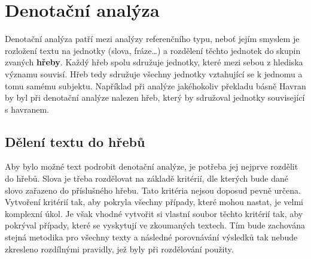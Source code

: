 \documentclass[dp.tex]{subfiles}
\begin{document}
\chapter{Denotační analýza}

Denotační analýza patří mezi analýzy referenčního typu, neboť jejím smyslem je rozložení textu na jednotky (slova, fráze\ldots) a rozdělení těchto jednotek do skupin zvaných \textbf{hřeby}. Každý hřeb spolu sdružuje jednotky, které mezi sebou z hlediska významu souvisí. Hřeb tedy sdružuje všechny jednotky vztahující se k jednomu a tomu samému subjektu. Například při analýze jakéhokoliv překladu básně Havran by byl při denotační analýze nalezen hřeb, který by sdružoval jednotky související s havranem.

\section{Dělení textu do hřebů}

Aby bylo možné text podrobit denotační analýze, je potřeba jej nejprve rozdělit do hřebů. Slova je třeba rozdělovat na základě kritérií, dle kterých bude dané slovo zařazeno do příslušného hřebu. Tato kritéria nejsou doposud pevně určena. Vytvoření kritérií tak, aby pokryla všechny případy, které mohou nastat, je velmi komplexní úkol. Je však vhodné vytvořit si vlastní soubor těchto kritérií tak, aby pokrýval případy, které se vyskytují ve zkoumaných textech. Tím bude zachována stejná metodika pro všechny texty a následné porovnávání výsledků tak nebude zkresleno rozdílnými pravidly, jež byly při rozdělování použity.
\end{document}
